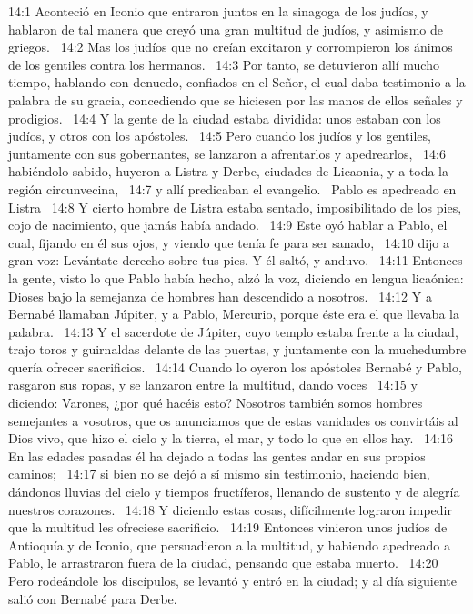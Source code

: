14:1 Aconteció en Iconio que entraron juntos en la sinagoga de los judíos, y hablaron de tal manera que creyó una gran multitud de judíos, y asimismo de griegos.  
14:2 Mas los judíos que no creían excitaron y corrompieron los ánimos de los gentiles contra los hermanos.  
14:3 Por tanto, se detuvieron allí mucho tiempo, hablando con denuedo, confiados en el Señor, el cual daba testimonio a la palabra de su gracia, concediendo que se hiciesen por las manos de ellos señales y prodigios.  
14:4 Y la gente de la ciudad estaba dividida: unos estaban con los judíos, y otros con los apóstoles.  
14:5 Pero cuando los judíos y los gentiles, juntamente con sus gobernantes, se lanzaron a afrentarlos y apedrearlos,  
14:6 habiéndolo sabido, huyeron a Listra y Derbe, ciudades de Licaonia, y a toda la región circunvecina,  
14:7 y allí predicaban el evangelio.  
Pablo es apedreado en Listra  
14:8 Y cierto hombre de Listra estaba sentado, imposibilitado de los pies, cojo de nacimiento, que jamás había andado.  
14:9 Este oyó hablar a Pablo, el cual, fijando en él sus ojos, y viendo que tenía fe para ser sanado,  
14:10 dijo a gran voz: Levántate derecho sobre tus pies. Y él saltó, y anduvo.  
14:11 Entonces la gente, visto lo que Pablo había hecho, alzó la voz, diciendo en lengua licaónica: Dioses bajo la semejanza de hombres han descendido a nosotros.  
14:12 Y a Bernabé llamaban Júpiter, y a Pablo, Mercurio, porque éste era el que llevaba la palabra.  
14:13 Y el sacerdote de Júpiter, cuyo templo estaba frente a la ciudad, trajo toros y guirnaldas delante de las puertas, y juntamente con la muchedumbre quería ofrecer sacrificios.  
14:14 Cuando lo oyeron los apóstoles Bernabé y Pablo, rasgaron sus ropas, y se lanzaron entre la multitud, dando voces  
14:15 y diciendo: Varones, ¿por qué hacéis esto? Nosotros también somos hombres semejantes a vosotros, que os anunciamos que de estas vanidades os convirtáis al Dios vivo, que hizo el cielo y la tierra, el mar, y todo lo que en ellos hay.  
14:16 En las edades pasadas él ha dejado a todas las gentes andar en sus propios caminos;  
14:17 si bien no se dejó a sí mismo sin testimonio, haciendo bien, dándonos lluvias del cielo y tiempos fructíferos, llenando de sustento y de alegría nuestros corazones.  
14:18 Y diciendo estas cosas, difícilmente lograron impedir que la multitud les ofreciese sacrificio.  
14:19 Entonces vinieron unos judíos de Antioquía y de Iconio, que persuadieron a la multitud, y habiendo apedreado a Pablo, le arrastraron fuera de la ciudad, pensando que estaba muerto.  
14:20 Pero rodeándole los discípulos, se levantó y entró en la ciudad; y al día siguiente salió con Bernabé para Derbe.  
